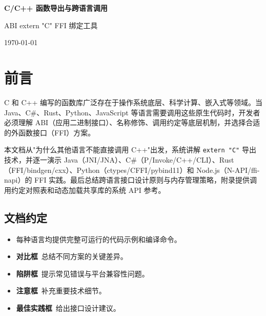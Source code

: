 \documentclass[12pt,a4paper,fontset=fandol]{ctexbook}
\newcommand{\cpp}[1]{C++#1}
\begin{document}
\frontmatter

\begin{titlepage}
\centering
\vspace*{3cm}
{\Huge\bfseries\color{algheadbg} C/C++ 函数导出与跨语言调用\par}
\vspace{1cm}
{\LARGE\color{blue!70!black} ABI \textbullet{} extern "C" \textbullet{} FFI \textbullet{} 绑定工具\par}
\vfill
{\large\color{gray} \today\par}
\end{titlepage}

\chapter*{前\quad 言}

C 和 \cpp{} 编写的函数库广泛存在于操作系统底层、科学计算、嵌入式等领域。当 Java、C\#、Rust、Python、JavaScript 等语言需要调用这些原生代码时，开发者必须理解 ABI（应用二进制接口）、名称修饰、调用约定等底层机制，并选择合适的外函数接口（FFI）方案。

本文档从"为什么其他语言不能直接调用 \cpp{}"出发，系统讲解 \texttt{extern "C"} 导出技术，并逐一演示 Java（JNI/JNA）、C\#（P/Invoke/C++/CLI）、Rust（FFI/bindgen/cxx）、Python（ctypes/CFFI/pybind11）和 Node.js（N-API/ffi-napi）的 FFI 实践。最后总结跨语言接口设计原则与内存管理策略，附录提供调用约定对照表和动态加载共享库的系统 API 参考。

\section*{文档约定}

\begin{itemize}[nosep]
  \item 每种语言均提供完整可运行的代码示例和编译命令。
  \item \textcolor{green!50!black}{\textbf{对比框}}~总结不同方案的关键差异。
  \item \textcolor{red!75!black}{\textbf{陷阱框}}~提示常见错误与平台兼容性问题。
  \item \textcolor{orange!50!black}{\textbf{注意框}}~补充重要技术细节。
  \item \textcolor{purple!50!black}{\textbf{最佳实践框}}~给出接口设计建议。
\end{itemize}

\makeatletter
\newif\ifhavemanualtoc
\IfFileExists{\jobname-manual.toc}{\havemanualtoctrue}{}
\ifhavemanualtoc
  \clearpage
\end{document}
